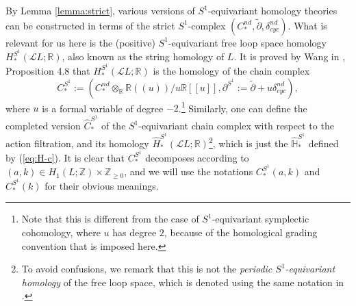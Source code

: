 \documentclass[a4paper]{article}
\numberwithin{equation}{section}
\begin{document}
By Lemma \ref{lemma:strict}, various versions of $S^1$-equivariant homology theories can be constructed in terms of the strict $S^1$-complex $(C_\ast^\mathit{nd},\tilde{\partial},\delta_\mathit{cyc}^\mathit{nd})$. What is relevant for us here is the (positive) $S^1$-equivariant free loop space homology $H_\ast^{S^1}(\mathcal{L}L;\mathbb{R})$, also known as the string homology of $L$. It is proved by Wang in \cite{yw}, Proposition 4.8 that $H_\ast^{S^1}(\mathcal{L}L;\mathbb{R})$ is the homology of the chain complex
\begin{equation}\label{eq:cpx-S1}
C_\ast^{S^1}:=\left(C_\ast^\mathit{nd}\otimes_\mathbb{R}\mathbb{R}(\!(u)\!)/u\mathbb{R}[\![u]\!],\partial^{S^1}:=\tilde{\partial}+u\delta_\mathit{cyc}^\mathit{nd}\right),
\end{equation}
where $u$ is a formal variable of degree $-2$.\footnote{Note that this is different from the case of $S^1$-equivariant symplectic cohomology, where $u$ has degree $2$, because of the homological grading convention that is imposed here.} Similarly, one can define the completed version $\widehat{C}_\ast^{S^1}$ of the $S^1$-equivariant chain complex with respect to the action filtration, and its homology $\widehat{H}_\ast^{S^1}(\mathcal{L}L;\mathbb{R})$\footnote{To avoid confusions, we remark that this is not the \textit{periodic $S^1$-equivariant homology} of the free loop space, which is denoted using the same notation in \cite{jz}.}, which is just the $\widehat{\mathbb{H}}_\ast^{S^1}$ defined by (\ref{eq:H-c}). It is clear that $C_\ast^{S^1}$ decomposes according to $(a,k)\in H_1(L;\mathbb{Z})\times\mathbb{Z}_{\geq0}$, and we will use the notations $C_\ast^{S^1}(a,k)$ and $C_\ast^{S^1}(k)$ for their obvious meanings.
\end{document}

